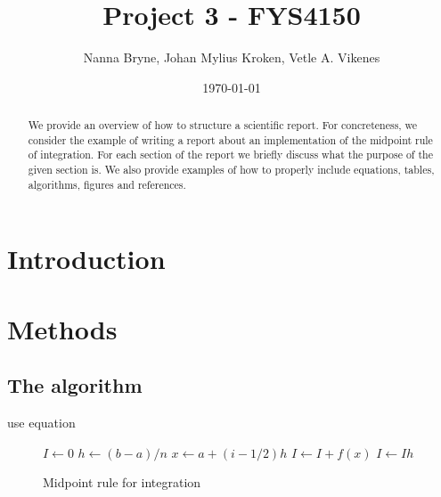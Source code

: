 \documentclass[english,notitlepage,reprint,nofootinbib]{revtex4-1}  %
\begin{document}
\title{Project 3 - FYS4150} 
\author{Nanna Bryne, Johan Mylius Kroken, Vetle A. Vikenes} 
\date{\today}                             
\noaffiliation                            

\begin{abstract}
    We provide an overview of how to structure a scientific report. For concreteness, we consider the example of writing a report about an implementation of the midpoint rule of integration. For each section of the report we briefly discuss what the purpose of the given section is. We also provide examples of how to properly include equations, tables, algorithms, figures and references.
\end{abstract}
\maketitle


\section{Introduction}
%

\section{Methods}\label{sec:methods}
%

\subsection*{The algorithm}
%
use equation~\cite{midpoint_rule}
\begin{figure}
    \begin{algorithm}[H]
    \caption{Midpoint rule for integration}
    \label{algo:midpointrule}
        \begin{algorithmic}
            \State $I \leftarrow 0$        
            \State $h \leftarrow (b-a)/n$  
            \State $x \leftarrow a + (i-1/2)h$    %
            \State $I \leftarrow I + f(x)$   %
            \EndFor
            \State $I \leftarrow Ih$  
            \EndProcedure
        \end{algorithmic}
    \end{algorithm}
\end{figure}
\end{document}
